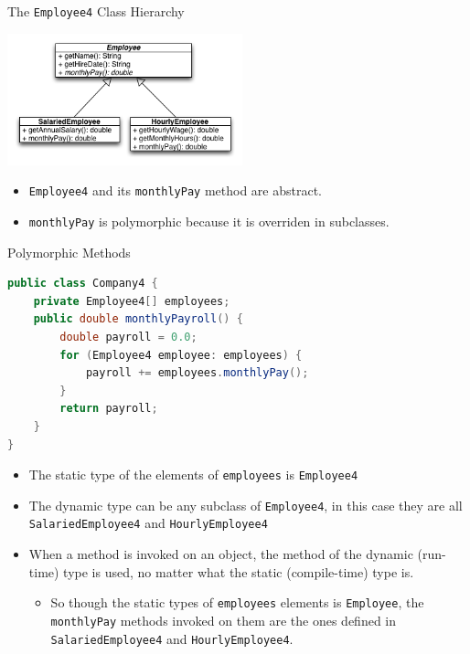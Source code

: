 \documentclass{beamer}
\begin{document}
\begin{frame}[fragile]{The {\tt Employee4} Class Hierarchy}

\begin{center}
\includegraphics[height=1.5in]{employee-uml.png}
\end{center}
\begin{itemize}
\item {\tt Employee4} and its {\tt monthlyPay} method are abstract.
\item {\tt monthlyPay} is polymorphic because it is overriden in subclasses.
\end{itemize}
\end{frame}

\begin{frame}[fragile]{Polymorphic Methods}

\vspace{-.05in}
\begin{lstlisting}[language=Java]
public class Company4 {
    private Employee4[] employees;
    public double monthlyPayroll() {
        double payroll = 0.0;
        for (Employee4 employee: employees) {
            payroll += employees.monthlyPay();
        }
        return payroll;
    }
}
\end{lstlisting}
\vspace{-.1in}
\begin{itemize}
\item The static type of the elements of {\tt employees} is {\tt Employee4}
\item The dynamic type can be any subclass of {\tt Employee4}, in this case they are all {\tt SalariedEmployee4} and {\tt HourlyEmployee4}
\item When a method is invoked on an object, the method of the dynamic (run-time) type is used, no matter what the static (compile-time) type is.
\begin{itemize}
\item So though the static types of {\tt employees} elements is {\tt Employee}, the {\tt monthlyPay} methods invoked on them are the ones defined in {\tt SalariedEmployee4} and {\tt HourlyEmployee4}.
\end{itemize}
\end{itemize}
\end{frame}
\end{document}
